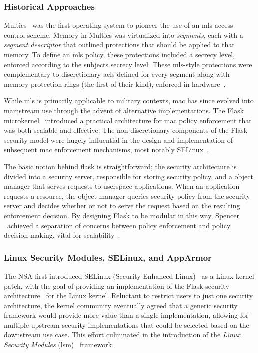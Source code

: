 \documentclass[
  fontsize=12pt,
  titlepage=firstiscover,
  paper=letter,
oneside,
  cleardoublepage=plain,
  parskip=half-,
  DIV=10,
  parindent,
  appendixprefix,
  chapterprefix,
  listof=totoc,
]{scrbook}
\begin{document}
\subsubsection*{Historical Approaches}

Multics~\cite{vyssotsky1965_multics, corbato1965_multics} was the first operating system
to pioneer the use of an \gls{mls} access control scheme. Memory in Multics was
virtualized into \textit{segments}, each with a \textit{segment descriptor} that outlined
protections that should be applied to that memory. To define an \gls{mls} policy, these
protections included a secrecy level, enforced according to the subjects secrecy level.
These \gls{mls}-style protections were complementary to discretionary \gls{acl}s defined
for every segment along with memory protection rings (the first of their kind), enforced
in hardware~\cite{jaeger2008_os_security}.

While \gls{mls} is primarily applicable to military contexts, \gls{mac} has since evolved
into mainstream use through the advent of alternative implementations. The Flask
microkernel~\cite{spencer1999_flask} introduced a practical architecture for \gls{mac}
policy enforcement that was both scalable and effective. The non-discretionary components
of the Flask security model were hugely influential in the design and implementation of
subsequent \gls{mac} enforcement mechanisms, most notably
SELinux~\cite{smalley2001_selinux, loscocco2001_selinux}.

The basic notion behind flask is straightforward; the security architecture is divided
into a security server, responsible for storing security policy, and a object manager that
serves requests to userspace applications. When an application requests a resource, the
object manager queries security policy from the security server and decides whether or not
to serve the request based on the resulting enforcement decision. By designing Flask to be
modular in this way, Spencer \etal~achieved a separation of concerns between policy
enforcement and policy decision-making, vital for scalability~\cite{spencer1999_flask,
smalley2001_selinux, loscocco2001_selinux}.

\subsubsection*{Linux Security Modules, SELinux, and AppArmor}

The NSA first introduced SELinux (Security Enhanced Linux)~\cite{smalley2001_selinux,
loscocco2001_selinux} as a Linux kernel patch, with the goal of providing an
implementation of the Flask security architecture~\cite{spencer1999_flask} for the Linux
kernel. Reluctant to restrict users to just one security architecture, the kernel
community eventually agreed that a generic security framework would provide more value
than a single implementation, allowing for multiple upstream security implementations that
could be selected based on the downstream use case. This effort culminated in the
introduction of the \textit{Linux Security Modules} (\gls{lsm})~\cite{wright2002_lsm} framework.
\end{document}
